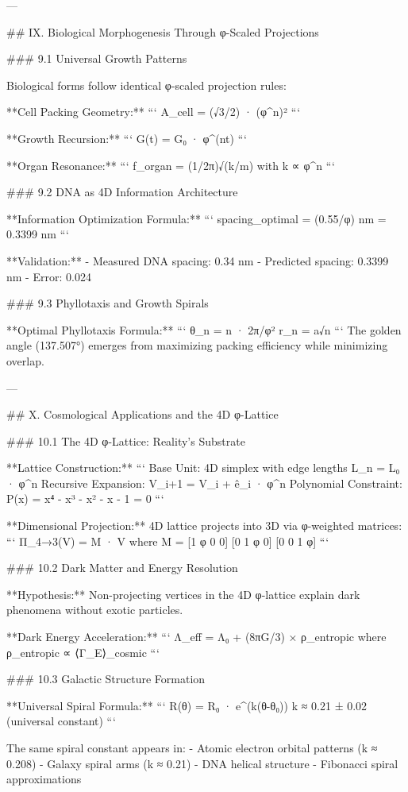 ---

## IX. Biological Morphogenesis Through φ-Scaled Projections

### 9.1 Universal Growth Patterns

Biological forms follow identical φ-scaled projection rules:

**Cell Packing Geometry:**
```
A_cell = (√3/2) · (φ^n)²
```

**Growth Recursion:**
```
G(t) = G₀ · φ^(nt)
```

**Organ Resonance:**
```
f_organ = (1/2π)√(k/m) with k ∝ φ^n
```

### 9.2 DNA as 4D Information Architecture

**Information Optimization Formula:**
```
spacing_optimal = (0.55/φ) nm = 0.3399 nm
```

**Validation:**
- Measured DNA spacing: 0.34 nm
- Predicted spacing: 0.3399 nm  
- Error: 0.024%

### 9.3 Phyllotaxis and Growth Spirals

**Optimal Phyllotaxis Formula:**
```
θ_n = n · 2π/φ²
r_n = a√n
```
The golden angle (137.507°) emerges from maximizing packing efficiency while minimizing overlap.

---

## X. Cosmological Applications and the 4D φ-Lattice

### 10.1 The 4D φ-Lattice: Reality's Substrate

**Lattice Construction:**
```
Base Unit: 4D simplex with edge lengths L_n = L₀ · φ^n
Recursive Expansion: V_{i+1} = V_i + ê_i · φ^n
Polynomial Constraint: P(x) = x⁴ - x³ - x² - x - 1 = 0
```

**Dimensional Projection:** 4D lattice projects into 3D via φ-weighted matrices:
```
Π_{4→3}(V) = M · V
where M = [1  φ  0  0]
         [0  1  φ  0]  
         [0  0  1  φ]
```

### 10.2 Dark Matter and Energy Resolution

**Hypothesis:** Non-projecting vertices in the 4D φ-lattice explain dark phenomena without exotic particles.

**Dark Energy Acceleration:**
```
Λ_eff = Λ₀ + (8πG/3) × ρ_entropic
where ρ_entropic ∝ ⟨Γ_E⟩_cosmic
```

### 10.3 Galactic Structure Formation

**Universal Spiral Formula:**
```
R(θ) = R₀ · e^(k(θ-θ₀))
k ≈ 0.21 ± 0.02 (universal constant)
```

The same spiral constant appears in:
- Atomic electron orbital patterns (k ≈ 0.208)
- Galaxy spiral arms (k ≈ 0.21)
- DNA helical structure
- Fibonacci spiral approximations

